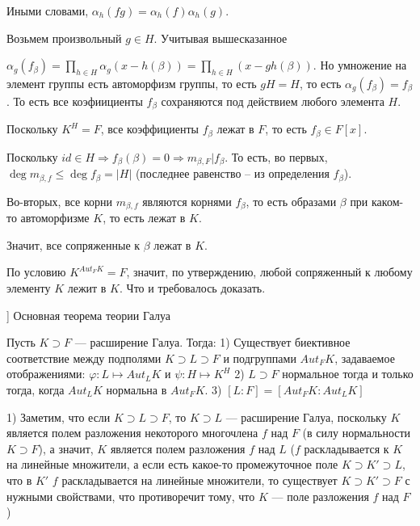 Иными словами, \(\alpha_h(fg) = \alpha_h(f)\alpha_h(g)\).

Возьмем произвольный \(g \in H\). Учитывая вышесказанное

\(\alpha_g(f_\beta) = \prod\limits_{h \in H} \alpha_g(x - h(\beta)) = \prod\limits_{h \in H} (x - gh(\beta))\). Но умножение на элемент группы есть автоморфизм группы, то есть \(gH = H\), то есть \(\alpha_g(f_\beta) = f_\beta\). То есть все коэфиициенты \(f_\beta\) сохраняются под действием любого элемента \(H\).

Поскольку \(K^H = F\), все коэффициенты \(f_\beta\) лежат в \(F\), то есть \(f_\beta \in F[x]\).

Поскольку \(id \in H \Rightarrow f_\beta(\beta) = 0 \Rightarrow m_{\beta, F} | f_\beta\). То есть, во первых, \(\deg m_{\beta, f} \leqslant \deg f_\beta = |H|\) (последнее равенство -- из определения \(f_\beta\)).

Во-вторых, все корни \(m_{\beta, f}\) являются корнями \(f_\beta\), то есть образами \(\beta\) при каком-то автоморфизме \(K\), то есть лежат в \(K\).

Значит, все сопряженные к \(\beta\) лежат в \(K\).

По условию \(K^{Aut_FK} = F\), значит, по утверждению, любой сопряженный к любому элементу \(K\) лежит в \(K\). Что и требовалось доказать.

\begin{problem}[8 [Каргальцев]]
Основная теорема теории Галуа

Пусть $K \supset F$ --- расширение Галуа. Тогда:
1) Существует биективное соответствие между подполями $K \supset L \supset F$ и подгруппами $Aut_FK$, задаваемое отображениями:
    $\varphi: L \mapsto Aut_LK$ и $\psi: H \mapsto K^H$
2) $L \supset F$ нормальное тогда и только тогда, когда $Aut_LK$ нормальна в $Aut_FK$.
3) $[L : F] = [Aut_FK : Aut_LK]$

\end{problem}

1) Заметим, что если \(K \supset L \supset F\), то \(K \supset L\) --- расширение Галуа, поскольку \(K\) является полем разложения некоторого многочлена \(f\) над \(F\) (в силу нормальности \(K \supset F\)), а значит, \(K\) является полем разложения \(f\) над \(L\) (\(f\) раскладывается к \(K\) на линейные множители, а если есть какое-то промежуточное поле \(K \supset K' \supset L\), что в \(K'\) \(f\) раскладывается на линейные множители, то существует \(K \supset K' \supset F\) с нужными свойствами, что противоречит тому, что \(K\) --- поле разложения \(f\) над \(F\))

